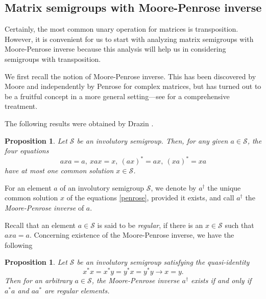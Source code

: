 \documentclass[11pt,reqno]{amsart}
\numberwithin{equation}{section}
\newtheorem{Prop}[Thm]{Proposition}
\theoremstyle{remark}
\begin{document}
\subsection{Matrix semigroups with Moore-Penrose inverse}
Certainly, the most common unary operation for matrices is
transposition. However, it is convenient for us to start with
analyzing matrix semigroups with Moore-Penrose inverse because
this analysis will help us in considering semigroups with
transposition.

We first recall the notion of Moore-Penrose inverse. This has been
discovered by Moore \cite{moore} and independently by Penrose
\cite{P} for complex matrices, but has turned out to be a fruitful
concept in a more general setting---see \cite{BIG} for a
comprehensive treatment.

The following results were obtained by Drazin \cite{D}.

\begin{Prop}\label{Theorem 3.3} {\rm\cite[Proposition 1]{D}}
Let $\mathcal{S}$ be an involutory semigroup. Then, for any given
$a\in\mathcal{S}$, the four equations
\begin{equation}
\label{penrose} axa=a,\ xax=x,\ (ax)^*=ax,\ (xa)^*=xa
\end{equation}
have at most one common solution $x\in\mathcal{S}$.
\end{Prop}

For an element $a$ of  an involutory semigroup $\mathcal{S}$, we
denote by $a^\dag$ the unique common solution $x$ of the equations
\eqref{penrose}, provided it exists, and call $a^\dag$ the
\emph{Moore-Penrose inverse} of $a$.

Recall that an element $a\in\mathcal{S}$ is said to be
\emph{regular}, if there is an $x\in\mathcal{S}$ such that
$axa=a$. Concerning existence of the Moore-Penrose inverse, we
have the following
\begin{Prop}\label{Theorem 3.4} {\rm\cite[Proposition 2]{D}}
Let $\mathcal{S}$ be an involutory semigroup satisfying the
quasi-identity
\begin{equation}
\label{3.1} x^*x=x^*y=y^*x=y^*y\rightarrow x=y.
\end{equation}
Then for an arbitrary $a\in\mathcal{S}$, the Moore-Penrose inverse
$a^\dag$ exists if and only if $a^*a$ and $aa^*$ are regular
elements.
\end{Prop}
\end{document}
